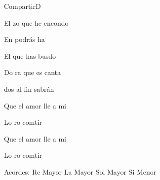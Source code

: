 \documentclass[12pt, spanish]{book}
\begin{document}
\begin{song}{Compartir}{D}
\begin{SBOpGroup}
            El zo que he encondo
            
            En  podrás ha

            El  que has busdo

            Do ra que es canta

            dos al fin sabrán

            Que el  amor lle a mi

            Lo ro comtir

            Que el  amor lle a mi

            Lo ro comtir
        \end{SBOpGroup}

        \ifChordBk
        \begin{SBOpGroup}
            Acordes:
            \upchord{\D}\qquad Re Mayor \hfill
            \upchord{\A}\qquad La Mayor \hfill\null\break
            \upchord{\G}\qquad Sol Mayor \hfill
            \upchord{\Bm}\qquad Si Menor \hfill\null\break
        \end{SBOpGroup}
        \fi
    \end{song}
\end{document}
